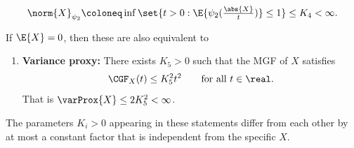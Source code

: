 \begin{mdframed}[innertopmargin=0pt]
\begin{theorem}
\begin{enumerate}[label=(\roman*), noitemsep]
        \[
            \norm{X}_{\psi_2} \coloneq \inf\set{t > 0 :
            \E{\psi_2(\tfrac{\abs{X}}t)} \le 1}
            \le K_4 < \infty.
        \]
    \end{enumerate}
    If \(\E{X} = 0\), then these are also equivalent to
    \begin{enumerate}[label=(\roman*), resume, noitemsep]
        \item\label{it: subgaussian variance proxy}
        \textbf{Variance proxy:} There exists \(K_5 > 0\) such that the MGF of \(X\) satisfies
        \[
            \CGF_X(t) \le K_5^2 t^2
            \qquad\text{for all } t\in \real.
        \]
        That is \(\varProx{X} \le 2K_5^2 < \infty\).
    \end{enumerate} 
    The parameters \(K_i>0\) appearing in these statements differ from
    each other by at most a constant factor that is independent from the
    specific \(X\).
    \begin{center}
        \hspace{-1em}
\end{center}
\end{theorem}
\end{mdframed}
